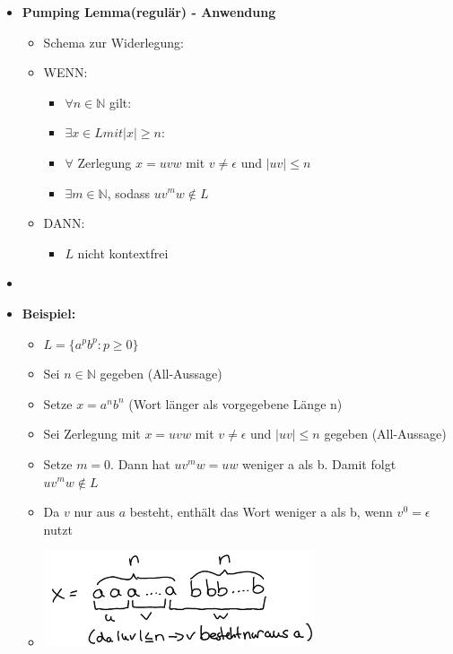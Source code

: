 \documentclass[11pt,a4paper]{article}
\begin{document}
\begin{itemize}
\item {\large \textbf{Pumping Lemma(regulär) - Anwendung}}
	\begin{itemize}
	\item Schema zur Widerlegung:
	\item WENN: 
		\begin{itemize}
		\item $\forall n \in \mathbb{N}$ gilt:
		\item $\exists x \in L mit |x| \geq n$:
		\item $\forall$ Zerlegung $x=uvw$ mit $v \neq \epsilon$ und $|uv| \leq n$
		\item $\exists m \in \mathbb{N}$, sodass $uv^mw \notin L$
		\end{itemize}
	\item DANN: 
		\begin{itemize}
		\item $L$ nicht kontextfrei
		\end{itemize}
	\end{itemize}
	\item[]
	\item \textbf{Beispiel:}
		\begin{itemize}
		\item $L=\{a^pb^p : p \geq 0 \}$
		\item Sei $n \in \mathbb{N}$ gegeben (All-Aussage)
		\item Setze $x = a^nb^n$ (Wort länger als vorgegebene Länge n)
		\item Sei Zerlegung mit $x=uvw$ mit $v \neq \epsilon$ und $|uv| \leq n$ gegeben (All-Aussage)
		\item Setze $m = 0$. Dann hat $uv^mw = uw$ weniger a als b. Damit folgt $uv^mw \notin L$ 
		\item Da $v$ nur aus $a$ besteht, enthält das Wort weniger a als b, wenn $v^0 = \epsilon$ nutzt
		\item[]
			\begin{center}
			\includegraphics[width=8cm]{pump1}
			\end{center}
		\end{itemize}	



\end{itemize}
\end{document}
